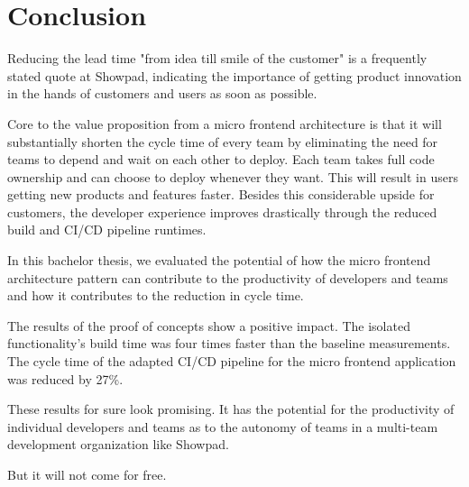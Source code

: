 
\chapter{Conclusion}
\label{ch:conclusie}

Reducing the lead time "from idea till smile of the customer" is a frequently stated quote at Showpad, indicating the importance of getting product innovation in the hands of customers and users as soon as possible.

Core to the value proposition from a micro frontend architecture is that it will substantially shorten the cycle time of every team by eliminating the need for teams to depend and wait on each other to deploy. Each team takes full code ownership and can choose to deploy whenever they want. This will result in users getting new products and features faster. Besides this considerable upside for customers, the developer experience improves drastically through the reduced build and CI/CD pipeline runtimes.

In this bachelor thesis, we evaluated the potential of how the micro frontend architecture pattern can contribute to the productivity of developers and teams and how it contributes to the reduction in cycle time. 

The results of the proof of concepts show a positive impact. The isolated functionality's build time was four times faster than the baseline measurements. The cycle time of the adapted CI/CD pipeline for the micro frontend application was reduced by 27\%.

These results for sure look promising. It has the potential for the productivity of individual developers and teams as to the autonomy of teams in a multi-team development organization like Showpad. 

But it will not come for free. 

